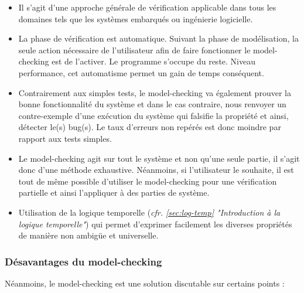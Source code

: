 \documentclass[runningheads,a4paper,10pt]{llncs}
\begin{document}
\begin{itemize}
\item Il s'agit d'une approche générale de vérification applicable dans tous les domaines tels que les systèmes embarqués ou ingénierie logicielle. 
\item La phase de vérification est automatique. Suivant la phase de modélisation, la seule action nécessaire de l'utilisateur afin de faire fonctionner le model-checking est de l'activer. Le programme s'occupe du reste. Niveau performance, cet automatisme permet un gain de temps conséquent. 
\item Contrairement aux simples tests, le model-checking va également prouver la bonne fonctionnalité du système et dans le cas contraire, nous renvoyer un contre-exemple d'une exécution du système qui falsifie la propriété et ainsi, détecter le(s) bug(s). Le taux d'erreurs non repérés est donc moindre par rapport aux tests simples. 
\item Le model-checking agit sur tout le système et non qu'une seule partie, il s'agit donc d'une méthode exhaustive. Néanmoins, si l'utilisateur le souhaite, il est tout de même possible d'utiliser le model-checking pour une vérification partielle et ainsi l'appliquer à des parties de système. 
\item Utilisation de la logique temporelle (\textit{cfr. \autoref{sec:log-temp} "Introduction à la logique temporelle"}) qui permet d'exprimer facilement les diverses propriétés de manière non ambigüe et universelle. 
\end{itemize}

\subsubsection{Désavantages du model-checking} \label{sec:desavantages}

Néanmoins, le model-checking est une solution discutable sur certains points : 
\end{document}
